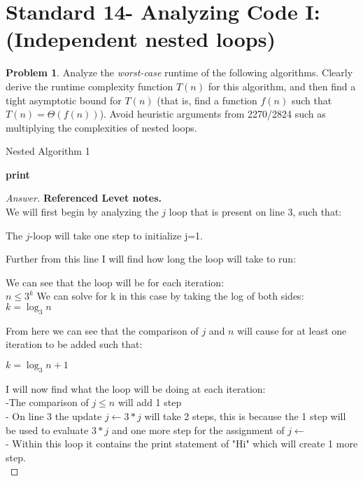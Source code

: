 \documentclass[11pt]{article}
\theoremstyle{definition}
\theoremstyle{definition}
\newtheorem{required}{Problem}
\theoremstyle{definition}
\begin{document}
\section{Standard 14- Analyzing Code I: (Independent nested loops)}
\begin{required}


Analyze the \textit{worst-case} runtime of the following algorithms. Clearly derive the runtime complexity function $T(n)$ for this algorithm, and then find a tight asymptotic bound for $T(n)$ (that is, find a function $f(n)$ such that $T(n) = \Theta(f(n))$). Avoid heuristic arguments from 2270/2824 such as multiplying the complexities of nested loops.



\begin{algorithm}
\caption{Nested Algorithm 1}\label{alg:Nested2}
\begin{algorithmic}[1]
		\State \textbf{print} 
	\EndFor
\EndFor
\EndProcedure
\end{algorithmic}
\end{algorithm}
\begin{proof}[Answer] \textbf{Referenced Levet notes.} \\
We will first begin by analyzing the $j$ loop that is present on line 3, such that: \\
\begin{center}
The $j$-loop will take one step to initialize j=1.
\end{center}
Further from this line I will find how long the loop will take to run: \\
\begin{center}
We can see that the loop will be for each iteration: \\
$n \leq 3^{k}$
We can solve for k in this case by taking the log of both sides: \\
$k = \log_3 n$
\end{center}
From here we can see that the comparison of $j$ and $n$ will cause for at least one iteration to be added such that: \\
\begin{center}
$k = \log_3 n + 1$
\end{center}
I will now find what the loop will be doing at each iteration: \\
\indent -The comparison of $j\leq n$ will add 1 step \\
\indent - On line 3 the update $j \leftarrow 3 * j$ will take 2 steps, this is because the 1 step will be used to evaluate $3 * j$ and \indent one more step for the assignment of $j \leftarrow$ \\
\indent - Within this loop it contains the print statement of "Hi" which will create 1 more step. \\


\end{proof}
\end{required}
\end{document}
